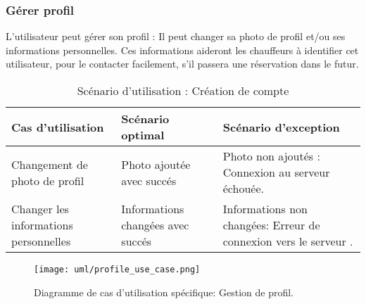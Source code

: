 \subsubsection{Gérer profil}
L'utilisateur peut gérer son profil : Il peut changer sa photo de profil et/ou ses informations personnelles. Ces informations aideront les chauffeurs à identifier cet utilisateur, pour le contacter facilement, s'il passera une réservation dans le futur.
\begin{table}[H]
    \begin{center}
        \begin{tabularx}{\textwidth} {
                | >{\centering\arraybackslash}X
                | >{\centering\arraybackslash}X
                | >{\centering\arraybackslash}X |}
            \hline
            Cas d'utilisation                     & Scénario optimal                  & Scénario d'exception                                             \\
            \hline
            Changement de photo de profil         & Photo ajoutée avec succés         & Photo non ajoutés : Connexion au serveur échouée.                \\
            \hline
            Changer les informations personnelles & Informations changées avec succés & Informations non changées: Erreur de connexion vers le serveur . \\
            \hline
        \end{tabularx}
        \captionsetup{justification=centering}
        \caption{Scénario d'utilisation : Création de compte}
        \label{tab:profile_update_scenario}
    \end{center}
\end{table}
\begin{figure}[H]
    \centering
    \texttt{[image: uml/profile\_use\_case.png]}
    \vspace{1cm}
    \captionsetup{justification=centering}
    \caption{Diagramme de cas d'utilisation spécifique: Gestion de profil.}
    \label{fig:use_case_manage_profile}
\end{figure}
